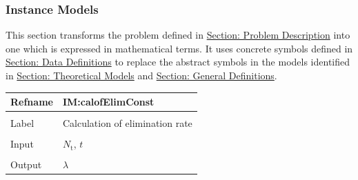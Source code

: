 \documentclass[12pt]{article}
\begin{document}
\subsubsection{Instance Models}
\label{Sec:IMs}
This section transforms the problem defined in \hyperref[Sec:ProbDesc]{Section: Problem Description} into one which is expressed in mathematical terms. It uses concrete symbols defined in \hyperref[Sec:DDs]{Section: Data Definitions} to replace the abstract symbols in the models identified in \hyperref[Sec:TMs]{Section: Theoretical Models} and \hyperref[Sec:GDs]{Section: General Definitions}.

\vspace{\baselineskip}
\noindent
\begin{minipage}{\textwidth}
\begin{tabular}{>{\raggedright}p{}>{\raggedright\arraybackslash}p{}}
\toprule \textbf{Refname} & \textbf{IM:calofElimConst}
\label{IM:calofElimConst}
\\ \midrule \\
Label & Calculation of elimination rate
        
\\ \midrule \\
Input & ${N_{\text{t}}}$, $t$
        
\\ \midrule \\
Output & $λ$
         

\end{tabular}
\end{minipage}
\end{document}
